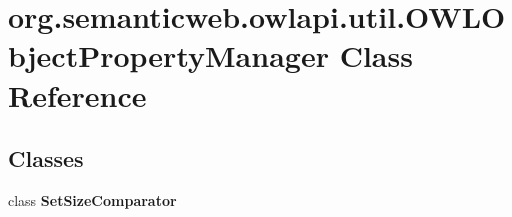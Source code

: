 \hypertarget{classorg_1_1semanticweb_1_1owlapi_1_1util_1_1_o_w_l_object_property_manager}{\section{org.\-semanticweb.\-owlapi.\-util.\-O\-W\-L\-Object\-Property\-Manager Class Reference}
\label{classorg_1_1semanticweb_1_1owlapi_1_1util_1_1_o_w_l_object_property_manager}
}
\subsection*{Classes}
\begin{DoxyCompactItemize}
\item 
class {\bfseries Set\-Size\-Comparator}
\end{DoxyCompactItemize}

